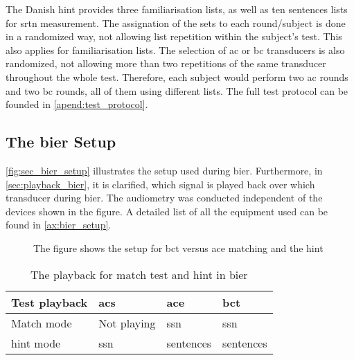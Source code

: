The Danish \gls{hint} provides three familiarisation lists, as well as ten sentences lists for \gls{srtn} measurement. The assignation of the sets to each round/subject is done in a randomized way, not allowing list repetition within the subject's test. This also applies for familiarisation lists. The selection of \gls{ac} or \gls{bc} transducers is also randomized, not allowing more than two repetitions of the same transducer throughout the whole test. Therefore, each subject would perform two \gls{ac} rounds and two \gls{bc} rounds, all of them using different lists. The full test protocol can be founded in \autoref{apend:test_protocol}.


\subsection{The \gls{bier} Setup}
\autoref{fig:sec_bier_setup} illustrates the setup used during \gls{bier}. Furthermore, in \autoref{sec:playback_bier}, it is clarified, which signal is played back over which transducer during \gls{bier}. The audiometry was conducted independent of the devices shown in the figure. A detailed list of all the equipment used can be found in \autoref{ax:bier_setup}. 

\newpage
\begin{figure}[H]
	\begin{sideways}
	\begin{minipage}{\textheight}
		\centering
\def\svgwidth{\columnwidth}

	\end{minipage}
	\end{sideways}
\caption{The figure shows the setup for \gls{bct} versus \gls{ace} matching and the \gls{hint} }
\label{fig:sec_bier_setup}
\end{figure}


\begin{table}[H]
\centering
\caption{The playback for match test and \gls{hint} in \gls{bier}}
\begin{tabular}{l|lll}
Test playback   & \gls{acs}   & \gls{ace} & \gls{bct} \\ \hline
Match mode      & Not playing & \gls{ssn} & \gls{ssn} \\
\gls{hint} mode & \gls{ssn}   & sentences & sentences
\end{tabular}
\label{sec:playback_bier}
\end{table}


















